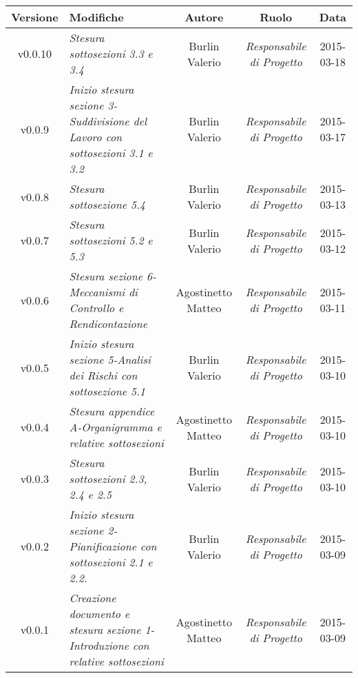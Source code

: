 \newpage

\begin{table}[h]
\centering
\begin{tabular}{|c|p{}|c|c|c|}
	\toprule
		\textbf{Versione} & \textbf{Modifiche} & \textbf{Autore} & \textbf{Ruolo} & \textbf{Data}\\
	\midrule
	\midrule
		v0.0.10 & \textit{Stesura sottosezioni 3.3 e 3.4} & Burlin Valerio & \textit{Responsabile di Progetto} & 2015-03-18\\
	\midrule
		v0.0.9 & \textit{Inizio stesura sezione 3-Suddivisione del Lavoro con sottosezioni 3.1 e 3.2} & Burlin Valerio & \textit{Responsabile di Progetto} & 2015-03-17\\
	\midrule
		v0.0.8 & \textit{Stesura sottosezione 5.4} & Burlin Valerio & \textit{Responsabile di Progetto} & 2015-03-13\\
	\midrule
		v0.0.7 & \textit{Stesura sottosezioni 5.2 e 5.3} & Burlin Valerio & \textit{Responsabile di Progetto} & 2015-03-12\\
	\midrule
		v0.0.6 & \textit{Stesura sezione 6-Meccanismi di Controllo e Rendicontazione} & Agostinetto Matteo & \textit{Responsabile di Progetto} & 2015-03-11\\
	\midrule
		v0.0.5 & \textit{Inizio stesura sezione 5-Analisi dei Rischi con sottosezione 5.1} & Burlin Valerio & \textit{Responsabile di Progetto} & 2015-03-10\\
	\midrule
		v0.0.4 & \textit{Stesura appendice A-Organigramma e relative sottosezioni} & Agostinetto Matteo & \textit{Responsabile di Progetto} & 2015-03-10\\
	\midrule
		v0.0.3 & \textit{Stesura sottosezioni 2.3, 2.4 e 2.5} & Burlin Valerio & \textit{Responsabile di Progetto} & 2015-03-10\\
	\midrule
		v0.0.2 & \textit{Inizio stesura sezione 2-Pianificazione con sottosezioni 2.1 e 2.2.} & Burlin Valerio & \textit{Responsabile di Progetto} & 2015-03-09\\
	\midrule
		v0.0.1 & \textit{Creazione documento e stesura sezione 1-Introduzione con relative sottosezioni} & Agostinetto Matteo & \textit{Responsabile di Progetto} & 2015-03-09\\
	\bottomrule
\end{tabular}
\end{table}

\newpage
